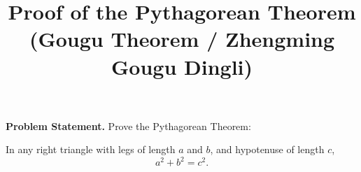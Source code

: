 \documentclass{article}
\title{Proof of the Pythagorean Theorem\\[4pt]
{\large (Gougu Theorem / Zhengming Gougu Dingli)}}
\date{}
\begin{document}
\maketitle

\noindent\textbf{Problem Statement.} Prove the Pythagorean Theorem:

\medskip
In any right triangle with legs of length $a$ and $b$, and hypotenuse of
length $c$,
\[
  a^2 + b^2 = c^2.
\]
\end{document}
